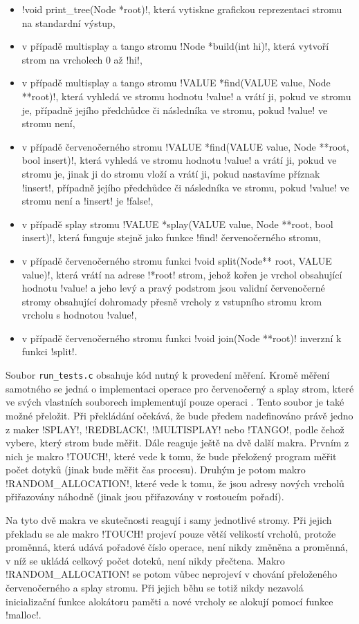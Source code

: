 \begin{itemize}
\item !void print_tree(Node *root)!, která vytiskne grafickou reprezentaci stromu na standardní výstup,
\item v případě multisplay a tango stromu !Node *build(int hi)!, která vytvoří strom na vrcholech 0 až !hi!,
\item v případě multisplay a tango stromu !VALUE *find(VALUE value, Node **root)!, která vyhledá ve stromu hodnotu !value! a vrátí ji, pokud ve stromu je, případně jejího předchůdce či následníka ve stromu, pokud !value! ve stromu není,
\item v případě červenočerného stromu !VALUE *find(VALUE value, Node **root, bool insert)!, která vyhledá ve stromu hodnotu !value! a vrátí ji, pokud ve stromu je, jinak ji do stromu vloží a vrátí ji, pokud nastavíme příznak !insert!, případně jejího předchůdce či následníka ve stromu, pokud !value! ve stromu není a !insert! je !false!,
\item v případě splay stromu !VALUE *splay(VALUE value, Node **root, bool insert)!, která funguje stejně jako funkce !find! červenočerného stromu,
\item v případě červenočerného stromu funkci !void split(Node** root, VALUE value)!, která vrátí na adrese !*root! strom, jehož kořen je vrchol obsahující hodnotu !value! a jeho levý a pravý podstrom jsou validní červenočerné stromy obsahující dohromady přesně vrcholy z vstupního stromu krom vrcholu s hodnotou !value!,
\item v případě červenočerného stromu funkci !void join(Node **root)! inverzní k funkci !split!.
\end{itemize}

Soubor {\tt run_tests.c} obsahuje kód nutný k provedení měření. Kromě měření
samotného se jedná o implementaci operace  pro červenočerný a splay
strom, které ve svých vlastních souborech implementují pouze operaci
. Tento soubor je také možné přeložit. Při překládání očekává, že
bude předem nadefinováno právě jedno z maker !SPLAY!, !REDBLACK!, !MULTISPLAY!
nebo !TANGO!, podle čehož vybere, který strom bude měřit. Dále reaguje ještě na
dvě další makra. Prvním z nich je makro !TOUCH!, které vede k tomu, že bude
přeložený program měřit počet dotyků (jinak bude měřit čas procesu). Druhým je
potom makro !RANDOM_ALLOCATION!, které vede k tomu, že jsou adresy nových
vrcholů přiřazovány náhodně (jinak jsou přiřazovány v rostoucím pořadí).

Na tyto dvě makra ve skutečnosti reagují i samy jednotlivé stromy. Při jejich
překladu se ale makro !TOUCH! projeví pouze větší velikostí vrcholů, protože
proměnná, která udává pořadové číslo operace, není nikdy změněna a proměnná, v
níž se ukládá celkový počet doteků, není nikdy přečtena. Makro
!RANDOM_ALLOCATION! se potom vůbec neprojeví v chování přeloženého
červenočerného a splay stromu. Při jejich běhu se totiž nikdy nezavolá
inicializační funkce alokátoru paměti a nové vrcholy se alokují pomocí funkce
!malloc!.

